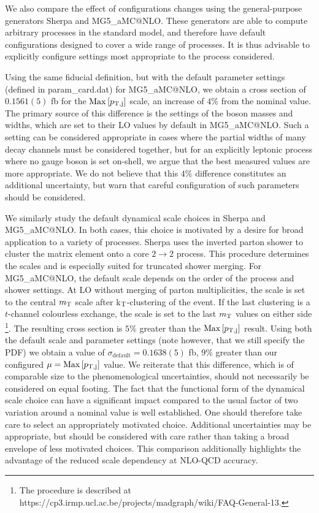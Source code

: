 \documentclass[11pt]{cernrep}
\makeatletter
\newcommand{\MGaMC}{M\protect\scalebox{0.8}{AD}G\protect\scalebox{0.8}{RAPH}5\_aMC@NLO\xspace}
\makeatother
\begin{document}
We also compare the effect of configurations changes using the general-purpose generators {\sc Sherpa} and \MGaMC. 
These generators are able to compute arbitrary processes in the standard model, 
and therefore have default configurations designed to cover a wide range of processes. It is thus advisable
to explicitly configure settings most appropriate to the process considered. 

Using the same fiducial definition, but with the default parameter settings (defined in param\_card.dat) for 
\MGaMC, we obtain a cross section of $0.1561(5)$ fb for the ${\rm Max}\left[p_{\rm T, j}\right]$
scale, an increase of $4\%$ from the nominal value. The primary source of this difference is the 
settings of the boson masses and widths, which are set to their LO values by default in \MGaMC.
Such a setting can be considered appropriate in cases where the partial widths of many decay channels
must be considered together, but for an explicitly leptonic process where no gauge boson is set on-shell, 
we argue that the best measured values are more appropriate.
We do not believe that this $4\%$ difference constitutes an additional uncertainty, but warn that
careful configuration of such parameters should be considered.

We similarly study the default dynamical scale choices in {\sc Sherpa} and \MGaMC. In both cases,
this choice is motivated by a desire for broad application to a variety of processes. Sherpa uses the inverted
parton shower to cluster the matrix element onto a core $2 \to 2$ process. This procedure determines the scales
and is especially suited for truncated shower merging. For \MGaMC,
the default scale depends on the order of the process and shower settings. At LO without
merging of parton multiplicities, the scale is set to the central $m_{\rm T}$ scale after k$_{\rm T}$-clustering of the event.
If the last clustering is a $t$-channel colourless exchange, the scale is set to the last $m_{\rm T}$ values on either side \footnote{The procedure is described at https://cp3.irmp.ucl.ac.be/projects/madgraph/wiki/FAQ-General-13.}.
The resulting cross section is $5\%$ greater than the ${\rm Max}\left[p_{\rm T, j}\right]$ result.
Using both the default scale and parameter settings (note however, that we still specify the PDF)
we obtain a value of $\sigma_{\mathrm{default}} = 0.1638(5)$ fb, $9\%$ greater than our configured
$\mu = {\rm Max}\left[p_{\rm T, j}\right]$ value. We reiterate that this difference, which is
of comparable size to the phenomenological uncertainties, should not necessarily be considered on equal footing.
The fact that the functional form of the dynamical scale choice can have a significant impact compared to the
usual factor of two variation around a nominal value is well established. One should therefore take care
to select an appropriately motivated choice. Additional uncertainties may be appropriate,
but should be considered with care rather than taking a broad envelope of less motivated choices.
This comparison additionally highlights the advantage of the reduced scale dependency at NLO-QCD accuracy.
\end{document}
